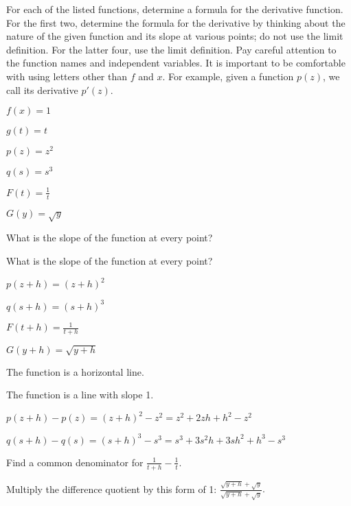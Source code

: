 \begin{activity} \label{A:1.4.2}
For each of the listed functions, determine a formula for the derivative function.  For the first two, determine the formula for the derivative by thinking about the nature of the given function and its slope at various points; do not use the limit definition.  For the latter four, use the limit definition.  Pay careful attention to the function names and independent variables.  It is important to be comfortable with using letters other than $f$ and $x$.  For example, given a function $p(z)$, we call its derivative $p'(z)$.
\ba
	\item $f(x) = 1$
	\item $g(t) = t$
	\item $p(z) = z^2$
	\item $q(s) = s^3$
	\item $F(t) = \frac{1}{t}$
	\item $G(y) = \sqrt{y}$
\ea

\end{activity}
\begin{smallhint}
\ba
	\item  What is the slope of the function at every point?
	\item  What is the slope of the function at every point?
	\item  $p(z+h) = (z+h)^2$
	\item  $q(s+h) = (s+h)^3$
	\item  $F(t+h) = \frac{1}{t+h}$
	\item  $G(y+h) = \sqrt{y+h}$
\ea
\end{smallhint}
\begin{bighint}
\ba
	\item  The function is a horizontal line.
	\item  The function is a line with slope 1.
	\item  $p(z+h) - p(z) = (z+h)^2 - z^2 = z^2 + 2zh + h^2 - z^2$
	\item  $q(s+h) - q(s) = (s+h)^3 - s^3 = s^3 + 3s^2h + 3sh^2 + h^3 - s^3$
	\item  Find a common denominator for $ \frac{1}{t+h} - \frac{1}{t}$.
	\item  Multiply the difference quotient by this form of 1: $\frac{\sqrt{y+h} + \sqrt{y}}{\sqrt{y+h} + \sqrt{y}}.$
\ea
\end{bighint}
